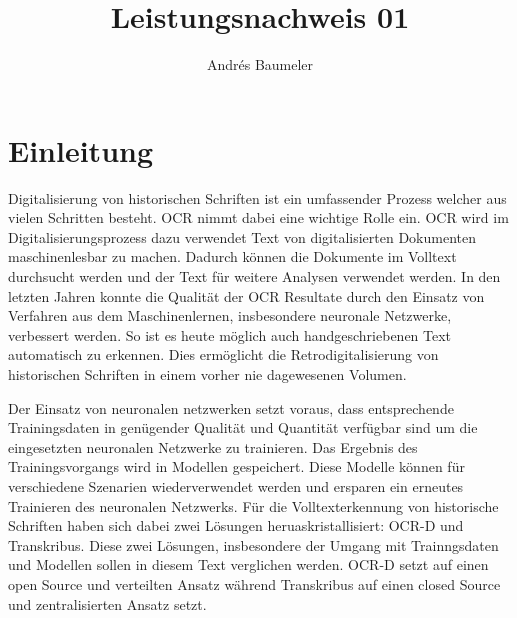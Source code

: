 \documentclass[a4paper,oneside, 12pt]{report}
\title{Leistungsnachweis 01}
\author{Andrés Baumeler}
\begin{document}

\pagestyle{empty} %





\cleardoublepage
\tableofcontents %
\cleardoublepage %

\pagestyle{plain} %



\chapter{Einleitung}\label{sec:motivation}
Digitalisierung von historischen Schriften ist ein umfassender Prozess welcher aus vielen Schritten besteht. \ac{OCR} nimmt dabei eine wichtige Rolle ein. \ac{OCR}  wird im Digitalisierungsprozess dazu verwendet Text von digitalisierten Dokumenten maschinenlesbar zu machen. Dadurch können die Dokumente im Volltext durchsucht werden und der Text für weitere Analysen verwendet werden. In den letzten Jahren konnte die Qualität der OCR Resultate durch den Einsatz von Verfahren aus dem Maschinenlernen, insbesondere neuronale Netzwerke, verbessert werden. So ist es heute möglich auch handgeschriebenen Text automatisch zu erkennen. Dies ermöglicht die Retrodigitalisierung von historischen Schriften in einem vorher nie dagewesenen Volumen. 

Der Einsatz von neuronalen netzwerken setzt voraus, dass entsprechende Trainingsdaten in genügender Qualität und Quantität verfügbar sind um die eingesetzten neuronalen Netzwerke zu trainieren. Das Ergebnis des Trainingsvorgangs wird in Modellen gespeichert. Diese Modelle können für verschiedene Szenarien wiederverwendet werden und ersparen ein erneutes Trainieren des neuronalen Netzwerks. 
Für die Volltexterkennung von historische Schriften haben sich dabei zwei Lösungen heruaskristallisiert: OCR-D und Transkribus. Diese zwei Lösungen, insbesondere der Umgang mit Trainngsdaten und Modellen
sollen in diesem Text verglichen werden. OCR-D setzt auf einen open Source und verteilten Ansatz während Transkribus auf einen closed Source und zentralisierten Ansatz setzt.
\end{document}
